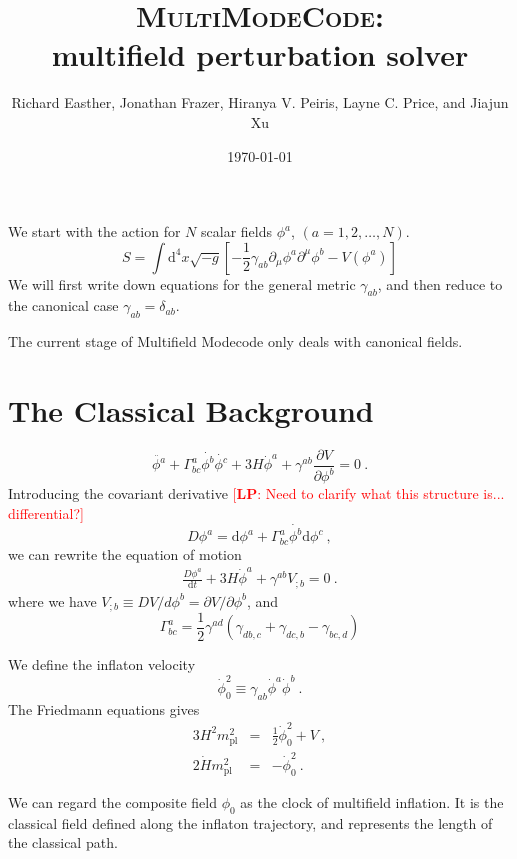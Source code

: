\documentclass[11pt]{article}
\title{\textsc{MultiModeCode}: \\ multifield perturbation solver}
\author{Richard Easther, Jonathan Frazer, Hiranya V. Peiris, Layne C. Price, and Jiajun Xu}
\date{\today}
\newcommand{\mpl}{m_{\mathrm{pl}}}
\newcommand{\ud}{\mathrm{d}}
\newcommand{\pd}{\partial}
\def\f {{\phi}}
\newcommand{\lp}[1]{\textcolor{red}{[{\bf LP}: #1]}}
\begin{document}
\maketitle

We start with the action for $N$ scalar fields $\phi^a$, $(a=1,2, \dots, N)$. 
\begin{equation}
S = \int \ud^4 x \sqrt{-g} \left[ -\frac{1}{2} \gamma_{ab} \pd_\mu \phi^a \pd^\mu \phi^b - V(\f^a) \right]
\end{equation}
We will first write down equations for the general metric $\gamma_{ab}$, and then reduce to the canonical case $\gamma_{ab} =\delta_{ab}$. 

The current stage of Multifield Modecode only deals with canonical fields. 

\section{The Classical Background}

\begin{equation}\label{bg_phi}
\ddot{\f^a} + \Gamma^a_{bc} \dot{\f^b} \dot{\f^c} + 3H \dot\f^a + \gamma^{ab} \frac{\pd V}{\pd \f^b} = 0  ~.
\end{equation}
Introducing the covariant derivative \lp{Need to clarify what this structure is... differential?}
\begin{equation}
D \f^a = \ud \f^a + \Gamma^a_{bc}\dot{\f^b}\ud\f^c ~,
\end{equation}
we can rewrite the equation of motion
\begin{eqnarray}
\frac{D\f^a}{\ud t} + 3H \dot\f^a + \gamma^{ab} V_{; b} = 0 ~. 
\end{eqnarray}
where we have $V_{;b} \equiv D V / d \f^b = \pd V/\pd \phi^b$, and
\[
\Gamma^a_{bc} = \frac{1}{2} \gamma^{ad}\left( \gamma_{db, c} + \gamma_{dc,b} - \gamma_{bc, d} \right)
\]

We define the inflaton velocity
\[
{\dot\f}_0^2 \equiv \gamma_{ab} {\dot\f}^a {\dot\f}^b ~. 
\]
The Friedmann equations gives
\begin{eqnarray}\label{fr_1}
3H^2\mpl^2 &=& \frac{1}{2} {\dot\f}_0^2 + V ~, \\ 
2\dot{H} \mpl^2 &=& - {\dot\f}_0^2 ~. \label{fr_2}
\end{eqnarray}

We can regard the composite field $\phi_0$ as the clock of multifield inflation. It is the classical field defined along the inflaton trajectory, and represents the length of the classical path.
\end{document}
